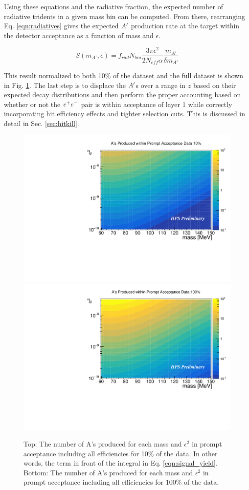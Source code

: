 Using these equations and the radiative fraction, the expected number of radiative tridents in a given mass bin can be computed. From there, rearranging Eq. \ref{eqn:radiatives} gives the expected $A^\prime$ production rate at the target within the detector acceptance as a function of mass and $\epsilon$. 

\begin{equation}
S(m_{A'},\epsilon)=f_{rad} N_{bin} \frac{3\pi \epsilon^2}{2N_{eff} \alpha} \frac{m_{A'}}{\delta m_{A'}} 
    \label{eqn:signal_prod}
\end{equation}

This result normalized to both 10\% of the dataset and the full dataset is shown in Fig. \ref{fig:ap_yield}. The last step is to displace the $A^\prime$s over a range in $z$ based on their expected decay distributions and then perform the proper accounting based on whether or not the $e^{+}e^{-}$ pair is within acceptance of layer 1 while correctly incorporating hit efficiency effects and tighter selection cuts. This is discussed in detail in Sec. \ref{sec:hitkill}.

\begin{figure}[t]
    \centering
    \includegraphics[width=.85\textwidth]{figs/Results/ap_produced.pdf}
    \includegraphics[width=.85\textwidth]{figs/recon/ap_produced_unblind.pdf}
    \caption{Top: The number of A's produced for each mass and $\epsilon^2$ in prompt acceptance including all efficiencies for 10\% of the data. In other words, the term in front of the integral in Eq. \ref{eqn:signal_yield}. Bottom: The number of A's produced for each mass and $\epsilon^2$ in prompt acceptance including all efficiencies for 100\% of the data.
    }
    \label{fig:ap_yield}
\end{figure}

\clearpage